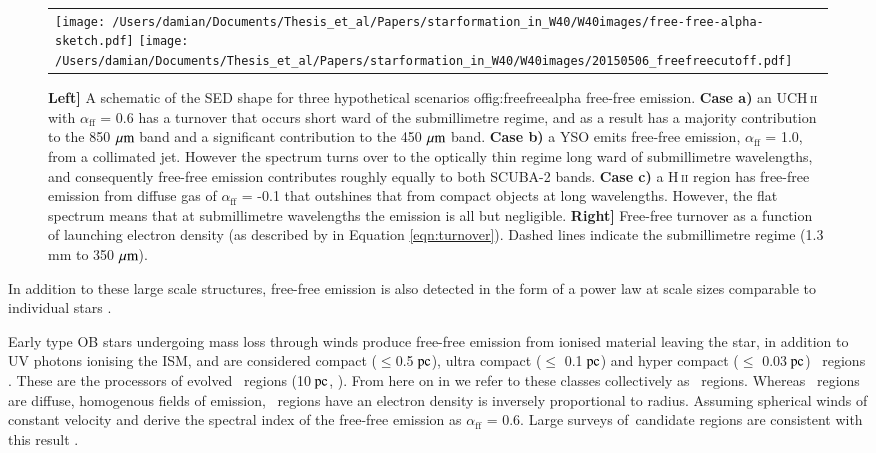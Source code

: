 \begin{figure}
\begin{centering}
\begin{tabular}{l}
\texttt{[image: /Users/damian/Documents/Thesis\_et\_al/Papers/starformation\_in\_W40/W40images/free-free-alpha-sketch.pdf]}
\texttt{[image: /Users/damian/Documents/Thesis\_et\_al/Papers/starformation\_in\_W40/W40images/20150506\_freefreecutoff.pdf]}
\end{tabular}
\caption{\textbf{Left]} A schematic of the SED shape for three hypothetical scenarios of{fig:freefreealpha} free-free emission. %
\textbf{Case a)} an UCH\,\textsc{ii} with $\alpha_{\mathrm{ff}}$ = 0.6 has a turnover that occurs short ward of the submillimetre regime, and as a result has a majority contribution to the 850\,$\,\mu\rm{m}$ band and a significant contribution to the 450\,$\,\mu\rm{m}$ band. %
\textbf{Case b)} a YSO emits free-free emission, $\alpha_{\mathrm{ff}}$ = 1.0, from a collimated jet. However the spectrum turns over to the optically thin regime long ward of submillimetre wavelengths, and consequently free-free emission contributes roughly equally to both SCUBA-2 bands. %
\textbf{Case c)} a H\,\textsc{ii} region has free-free emission from diffuse gas of $\alpha_{\mathrm{ff}}$ = -0.1 that outshines that from compact objects at long wavelengths. However, the flat spectrum means that at submillimetre wavelengths the emission is all but negligible.
\textbf{Right]} Free-free turnover as a function of launching electron density (as described by \citeauthor{Olnon:1975bh} \citeyear{Olnon:1975bh}  in Equation \ref{eqn:turnover}). Dashed lines indicate the submillimetre regime (1.3\,mm to 350\,$\,\mu\rm{m}$).}
\label{fig:freefreealpha}
\end{centering}
\end{figure} 

In addition to these large scale structures, free-free emission is also detected in the form of a power law at scale sizes comparable to individual stars \citep{Panagia:1975uq}. 

Early type OB stars undergoing mass loss through winds produce free-free emission from ionised material leaving the star, in addition to UV photons ionising the ISM, and are considered compact ($\leq$0.5$\hbox{ pc}$), ultra compact ($\leq$ 0.1$\hbox{ pc}$) and hyper compact ($\leq$ 0.03$\hbox{ pc}$) \HII\ regions \citep{Wright:1975kx, Harvey:1979qf}. These are the processors of evolved \HII\ regions (10$\hbox{ pc}$,\citeauthor{Kurtz:2005kl} \citeyear{Kurtz:2005kl}). From here on in we refer to these classes collectively as \UCHII\ regions. Whereas \HII\ regions are diffuse, homogenous fields of emission, \UCHII\ regions have an electron density is inversely proportional to radius. Assuming spherical winds of constant velocity \cite{Panagia:1975uq} and \cite{Wright:1975kx} derive the spectral index of the free-free emission as $\alpha_{\mathrm{ff}}$ = 0.6. Large surveys of \UCHII\,candidate regions are consistent with this result \citep{Harvey:1979qf, Wood:1989bh, Kurtz:1994cr, Molinari:1998dq, Walsh:1998nx, Kurtz:2005kl}.

